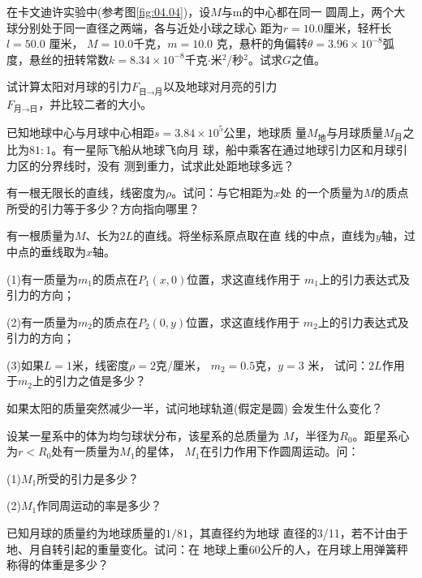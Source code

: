 \documentclass[../outline-of-mechanics.tex]{subfiles}
\begin{document}
\begin{exercises}

\exercise 在卡文迪许实验中(参考图\ref{fig:04.04})，设$ M $与$ $m的中心都在同一
圆周上，两个大球分别处于同一直径之两端，各与近处小球之球心
距为$ r = 1 0 . 0 $厘米，轻杆长$ l = 5 0 . 0 $ 厘米， $ M = 1 0 . 0 $千克，$ m = 1 0 . 0 $
克，悬杆的角偏转$ \theta = 3 . 9 6 \times 1 0 ^ { - 8 } $弧度，悬丝的扭转常数$ k = 8 . 3 4
  \times 1 0 ^ { - 8 } $千克$ \cdot $米$ ^2 $/秒$ ^2 $。试求$ G $之值。

\exercise 试计算太阳对月球的引力$ F _ {\text{日}\to\text{月}} $以及地球对月亮的引力\\
$ F _ {\text{月}\to\text{日}} $，并比较二者的大小。

\exercise 已知地球中心与月球中心相距$ s = 3 . 8 4 \times 1 0 ^ 5 $公里，地球质
量$ M _ {\text{地}} $与月球质量$ M _ {\text{月}}$之比为$ 81:1 $。有一星际飞船从地球飞向月
球，船中乘客在通过地球引力区和月球引力区的分界线时，没有
测到重力，试求此处距地球多远？

\exercise 有一根无限长的直线，线密度为$ \rho $。试问：与它相距为$ x $处
的一个质量为$ M $的质点所受的引力等于多少？方向指向哪里？

\clearpage
\exercise 有一根质量为$ M $、长为$ 2L $的直线。将坐标系原点取在直
线的中点，直线为$ y $轴，过中点的垂线取为$ x $轴。

(1)有一质量为$ m _ { 1 } $的质点在$ P _ { 1 } \left( x, 0 \right) $位置，求这直线作用于
$ m _ { 1 } $上的引力表达式及引力的方向；

(2)有一质量为$ m _ { 2 } $的质点在$ P _ { 2 } \left( 0, y \right) $位置，求这直线作用于
$ m _ { 2 } $上的引力表达式及引力的方向；

(3)如果$ L = 1 $米，线密度$ \rho = 2 $克/厘米， $ m _ { 2 } = 0 . 5 $克，$ y = 3 $ 米，
试问：$ 2L $作用于$ m _ { 2 } $上的引力之值是多少？

\exercise 如果太阳的质量突然减少一半，试问地球轨道(假定是圆)
会发生什么变化？

\exercise 设某一星系中的体为均匀球状分布，该星系的总质量为
$ M $，半径为$ R _ { 0 } $。距星系心为$ r < R _ { 0 } $处有一质量为$ M _ 1 $的星体，
$ M _ 1 $在引力作用下作圆周运动。问：

(1)$ M _ 1 $所受的引力是多少？

(2)$ M _ 1 $作同周运动的率是多少？

\exercise 已知月球的质量约为地球质量的$ 1/81 $，其直径约为地球
直径的3/11，若不计由于地、月自转引起的重量变化。试问：在
地球上重60公斤的人，在月球上用弹簧秤称得的体重是多少？


\end{exercises}
\end{document}
